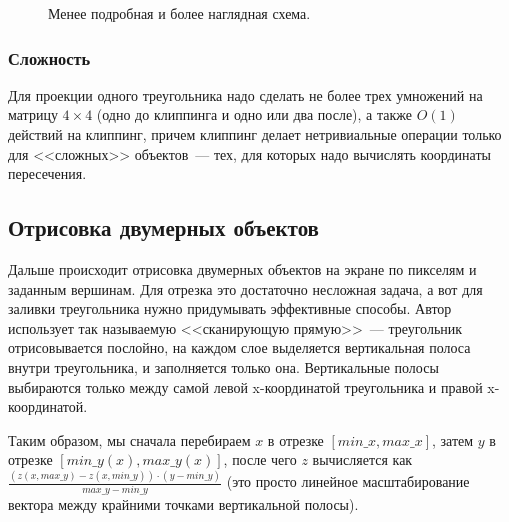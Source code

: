 \documentclass{article}
\begin{document}
\begin{center}
\begin{figure}[h]
\caption{Менее подробная и более наглядная схема.}
\label{ris:image}
\end{figure}
\end{center}

\subsubsection{Сложность} Для проекции одного треугольника надо сделать не более трех умножений на матрицу $4 \times 4$ (одно до клиппинга и одно или два после), а также $O(1)$ действий на клиппинг, причем клиппинг делает нетривиальные операции только для <<сложных>> объектов~--- тех, для которых надо вычислять координаты пересечения.

\newpage
\subsection{Отрисовка двумерных объектов}
Дальше происходит отрисовка двумерных объектов на экране по пикселям и заданным вершинам. Для отрезка это достаточно несложная задача, а вот для заливки треугольника нужно придумывать эффективные способы. Автор использует так называемую <<сканирующую прямую>>~--- треугольник отрисовывается послойно, на каждом слое выделяется вертикальная полоса внутри треугольника, и заполняется только она. Вертикальные полосы выбираются только между самой левой x-координатой треугольника и правой x-координатой.

Таким образом, мы сначала перебираем $x$ в отрезке $[min\_x, max\_x]$, затем $y$ в отрезке $[min\_y(x), max\_y(x)]$, после чего $z$ вычисляется как $\frac{(z(x, max\_y) - z(x, min\_y)) \cdot (y - min\_y)}{max\_y - min\_y}$ (это просто линейное масштабирование вектора между крайними точками вертикальной полосы).
\end{document}
